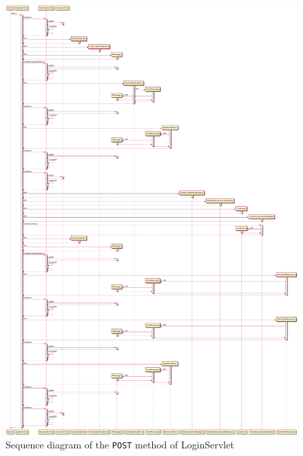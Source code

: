 \begin{figure}[H]
    \centering
    \includegraphics[width=\textwidth,height=0.95\textheight,keepaspectratio]{Schemas/LoginServlet_doPost.svg.pdf}
    \caption{Sequence diagram of the \texttt{POST} method of LoginServlet}
    \label{fig:LoginServlet_doPost}
\end{figure}
